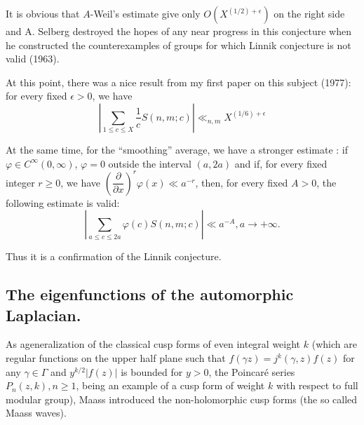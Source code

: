It is obvious that $A$-Weil's estimate give only $O(X^{(1/2)+\epsilon})$ on the right side and A. Selberg destroyed the hopes of any near progress in this conjecture when he constructed the counterexamples of groups for which Linnik conjecture is not valid (1963).

At this point, there was a nice result from my first paper on this subject (1977): for every fixed $\epsilon >0$, we have
\begin{equation}
\left|\sum\limits_{1 \leqslant c \leqslant X } \frac{1}{c} S (n, m;c) \right| \ll_{n,m} X^{(1/6)+\epsilon} \label{art7-eq1.11}
\end{equation}

At the same time, for the ``smoothing'' average, we have a stronger estimate : if $\varphi \in C^\infty (0,\infty)$, $\varphi =0$  outside the interval $(a, 2a)$ and if, for every fixed integer $r \geqslant 0$, we have $\left(\dfrac{\partial}{\partial x} \right)^r \varphi (x) \ll a^{-r}$, then, for every fixed $A>0$, the following estimate is valid:
\begin{equation}
\left|\sum\limits_{a \leqslant c \leqslant 2a} \varphi (c) S (n, m; c) \right| \ll a^{-A}, a \to + \infty.
\label{art7-eq1.12}
\end{equation}

Thus it is a confirmation of the Linnik conjecture.

\subsection{The eigenfunctions of the automorphic Laplacian.}\label{art7-subsec1.3}

As a\pageoriginale generalization of the classical cusp forms of even integral weight $k$ (which are regular functions on the upper half plane such that $f(\gamma z) = j^k (\gamma, z) f(z)$ for any $\gamma \in\Gamma$ and $y^{k/2} | f(z)|$ is bounded for $y >0$, the Poincar\'e series $P_n (z, k), n\geqslant 1$, being an example of a cusp form of weight $k$ with respect to full modular group), Maass introduced the non-holomorphic cusp forms (the so called Maass waves).

